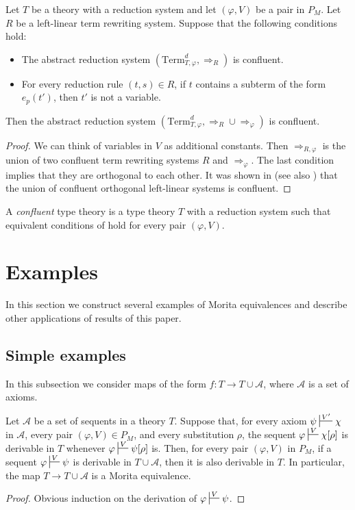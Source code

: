 \documentclass[reqno]{amsart}
\theoremstyle{definition}
\theoremstyle{remark}
\newcommand{\Term}{\mathrm{Term}}
\numberwithin{figure}{section}
\begin{document}
\begin{lem}
Let $T$ be a theory with a reduction system and let $(\varphi,V)$ be a pair in $P_M$.
Let $R$ be a left-linear term rewriting system.
Suppose that the following conditions hold:
\begin{itemize}
\item The abstract reduction system $(\Term_{T,\varphi}^d,\Rightarrow_R)$ is confluent.
\item For every reduction rule $(t,s) \in R$, if $t$ contains a subterm of the form $e_p(t')$, then $t'$ is not a variable.
\end{itemize}
Then the abstract reduction system $(\Term_{T,\varphi}^d, \Rightarrow_R \cup \Rightarrow_\varphi)$ is confluent.
\end{lem}
\begin{proof}
We can think of variables in $V$ as additional constants.
Then $\Rightarrow_{R,\varphi}$ is the union of two confluent term rewriting systems $R$ and $\Rightarrow_\varphi$.
The last condition implies that they are orthogonal to each other.
It was shown in \cite{raoult} (see also \cite[Theorem~8.6.35]{ohlebusch-advanced}) that the union of confluent orthogonal left-linear systems is confluent.
\end{proof}

\begin{defn}[confluent]
A \emph{confluent} type theory is a type theory $T$ with a reduction system such that equivalent conditions of  hold for every pair $(\varphi,V)$.
\end{defn}

\section{Examples}
\label{sec:examples}

In this section we construct several examples of Morita equivalences and describe other applications of results of this paper.

\subsection{Simple examples}
\label{sec:simple}

In this subsection we consider maps of the form $f : T \to T \cup \mathcal{A}$, where $\mathcal{A}$ is a set of axioms.

\begin{prop}
Let $\mathcal{A}$ be a set of sequents in a theory $T$.
Suppose that, for every axiom $\psi \sststile{}{V'} \chi$ in $\mathcal{A}$, every pair $(\varphi,V) \in P_M$, and every substitution $\rho$,
the sequent $\varphi \sststile{}{V} \chi[\rho]$ is derivable in $T$ whenever $\varphi \sststile{}{V} \psi[\rho]$ is.
Then, for every pair $(\varphi,V)$ in $P_M$, if a sequent $\varphi \sststile{}{V} \psi$ is derivable in $T \cup \mathcal{A}$, then it is also derivable in $T$.
In particular, the map $T \to T \cup \mathcal{A}$ is a Morita equivalence.
\end{prop}
\begin{proof}
Obvious induction on the derivation of $\varphi \sststile{}{V} \psi$.
\end{proof}
\end{document}

